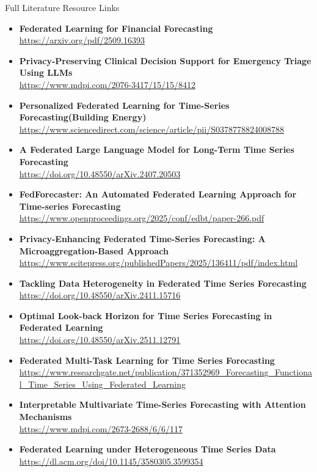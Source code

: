 \documentclass[aspectratio=169, 11pt]{beamer}
\begin{document}
\begin{frame}[allowframebreaks]{Full Literature Resource Links}
\begin{itemize}
        \item \textbf{\small Federated Learning for Financial Forecasting} \\ \url{https://arxiv.org/pdf/2509.16393}
        \item \textbf{\small Privacy-Preserving Clinical Decision Support for Emergency Triage Using LLMs} \\ \url{https://www.mdpi.com/2076-3417/15/15/8412}
        \item \textbf{\small Personalized Federated Learning for Time-Series Forecasting(Building Energy)} \\ \url{https://www.sciencedirect.com/science/article/pii/S0378778824008788}
        \item \textbf{\small A Federated Large Language Model for Long-Term Time Series Forecasting} \\ \url{https://doi.org/10.48550/arXiv.2407.20503}
        \item \textbf{\small FedForecaster: An Automated Federated Learning Approach for Time-series Forecasting} \\ \url{https://www.openproceedings.org/2025/conf/edbt/paper-266.pdf}
        \item \textbf{\small Privacy-Enhancing Federated Time-Series Forecasting: A Microaggregation-Based Approach} \\ \url{https://www.scitepress.org/publishedPapers/2025/136411/pdf/index.html}
        \item \textbf{\small Tackling Data Heterogeneity in Federated Time Series Forecasting} \\ \url{https://doi.org/10.48550/arXiv.2411.15716}
        \item \textbf{\small Optimal Look-back Horizon for Time Series Forecasting in Federated Learning} \\ \url{https://doi.org/10.48550/arXiv.2511.12791}
        \item \textbf{\small Federated Multi-Task Learning for Time Series Forecasting} \\ \url{https://www.researchgate.net/publication/371352969_Forecasting_Functional_Time_Series_Using_Federated_Learning}
        \item \textbf{\small Interpretable Multivariate Time-Series Forecasting with Attention Mechanisms} \\ \url{https://www.mdpi.com/2673-2688/6/6/117}
        \item \textbf{\small Federated Learning under Heterogeneous Time Series Data} \\ \url{https://dl.acm.org/doi/10.1145/3580305.3599354}

\end{itemize}
\end{frame}
\end{document}
